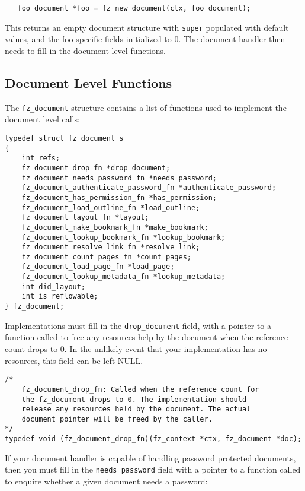 \documentclass[oneside]{book}
\begin{document}
\begin{lstlisting}
   foo_document *foo = fz_new_document(ctx, foo_document);
\end{lstlisting}

This returns an empty document structure with \texttt{super} populated with default values, and the foo specific fields initialized to 0. The document handler then needs to fill in the document level functions.

\subsection{Document Level Functions}

The \texttt{fz\_document} structure contains a list of functions used to implement the document level calls:

\begin{lstlisting}
typedef struct fz_document_s
{
	int refs;
	fz_document_drop_fn *drop_document;
	fz_document_needs_password_fn *needs_password;
	fz_document_authenticate_password_fn *authenticate_password;
	fz_document_has_permission_fn *has_permission;
	fz_document_load_outline_fn *load_outline;
	fz_document_layout_fn *layout;
	fz_document_make_bookmark_fn *make_bookmark;
	fz_document_lookup_bookmark_fn *lookup_bookmark;
	fz_document_resolve_link_fn *resolve_link;
	fz_document_count_pages_fn *count_pages;
	fz_document_load_page_fn *load_page;
	fz_document_lookup_metadata_fn *lookup_metadata;
	int did_layout;
	int is_reflowable;
} fz_document;
\end{lstlisting}

Implementations must fill in the \texttt{drop\_document} field, with a pointer to a function called to free any resources help by the document when the reference count drops to 0. In the unlikely event that your implementation has no resources, this field can be left NULL.

\begin{lstlisting}
/*
	fz_document_drop_fn: Called when the reference count for
	the fz_document drops to 0. The implementation should
	release any resources held by the document. The actual
	document pointer will be freed by the caller.
*/
typedef void (fz_document_drop_fn)(fz_context *ctx, fz_document *doc);
\end{lstlisting}

If your document handler is capable of handling password protected documents, then you must fill in the \texttt{needs\_password} field with a pointer to a function called to enquire whether a given document needs a password:
\end{document}

